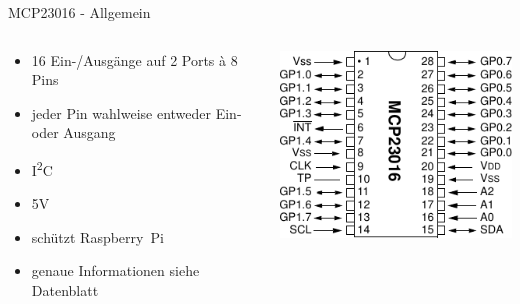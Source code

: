 \documentclass{beamer}
\newcommand{\ItC}{I\textsuperscript{2}C\xspace}
\newcommand{\RPi}{Raspberry~Pi\xspace}
\begin{document}
\begin{frame}{MCP23016 - Allgemein}\begin{columns}
  \begin{column}{.7\textwidth}
 \begin{itemize}
  \item 16 Ein-/Ausgänge auf 2 Ports à 8 Pins
  \item jeder Pin wahlweise entweder Ein- oder Ausgang
  \item \ItC
  \item 5V
  \item schützt \RPi
  \item genaue Informationen siehe Datenblatt
  \end{itemize}
  \end{column}
  \begin{column}{.3\textwidth}
 \includegraphics[width=\textwidth]{MCP23016}
  \end{column}
\end{columns}

\end{frame}
\end{document}
